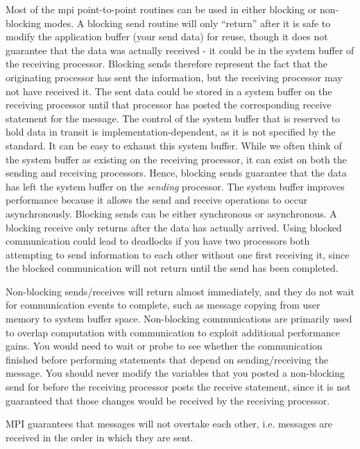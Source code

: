 \documentclass[10pt]{article}
\begin{document}
\begin{flushleft}
Most of the \gls{mpi} point-to-point routines can be used in either blocking or non-blocking modes. A blocking send routine will only ``return'' after it is safe to modify the application buffer (your send data) for reuse, though it does not guarantee that the data was actually received - it could be in the system buffer of the receiving processor. Blocking sends therefore represent the fact that the originating processor has sent the information, but the receiving processor may not have received it. The sent data could be stored in a system buffer on the receiving processor until that processor has posted the corresponding receive statement for the message. The control of the system buffer that is reserved to hold data in transit is implementation-dependent, as it is not specified by the standard. It can be easy to exhaust this system buffer. While we often think of the system buffer as existing on the receiving processor, it can exist on both the sending and receiving processors. Hence, blocking sends guarantee that the data has left the system buffer on the {\it sending} processor. The system buffer improves performance because it allows the send and receive operations to occur asynchronously. Blocking sends can be either synchronous or asynchronous. A blocking receive only returns after the data has actually arrived. Using blocked communication could lead to deadlocks if you have two processors both attempting to send information to each other without one first receiving it, since the blocked communication will not return until the send has been completed.

Non-blocking sends/receives will return almost immediately, and they do not wait for communication events to complete, such as message copying from user memory to system buffer space. Non-blocking communications are primarily used to overlap computation with communication to exploit additional performance gains. You would need to wait or probe to see whether the communication finished before performing statements that depend on sending/receiving the message. You should never modify the variables that you posted a non-blocking send for before the receiving processor posts the receive statement, since it is not guaranteed that those changes would be received by the receiving processor. 

MPI guarantees that messages will not overtake each other, i.e. messages are received in the order in which they are sent. 


\end{flushleft}
\end{document}

